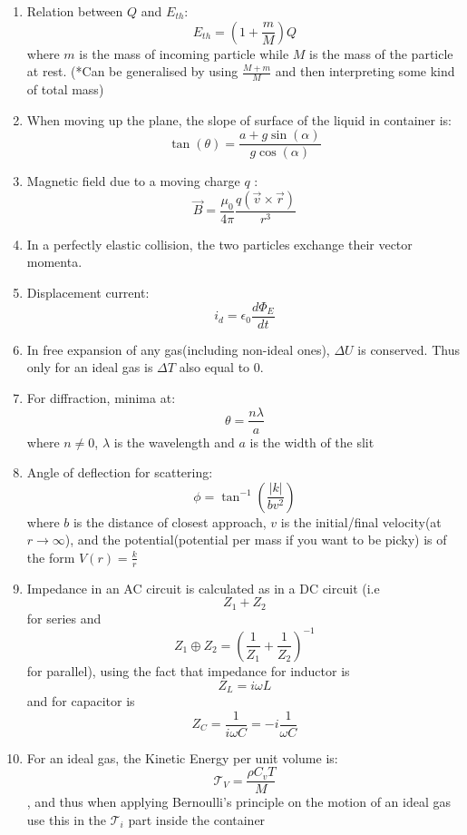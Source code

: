 \documentclass{article}
\numberwithin{equation}{section}
\numberwithin{figure}{section}
\newcommand{\Cr}{\times}
\begin{document}
\begin{enumerate}
	\item Relation between $Q$ and $E_{th}$:
		\begin{equation}
			E_{th}=\left(1+\frac{m}{M}\right) Q
		\end{equation}
		where $m$ is the mass of incoming particle while $M$ is the mass of the particle at rest. (*Can be generalised by using $\frac{M+m}{M}$ and then interpreting some kind of total mass)
	\item When moving up the plane, the slope of surface of the liquid in container is:
		\begin{equation}
			\tan(\theta)=\frac{a+g \sin(\alpha)}{g\cos(\alpha)}
		\end{equation}
	\item Magnetic field due to a moving charge $q$ :
		\begin{equation}
			\vec{B}=\frac{\mu_0}{4\pi}\frac{q(\vec{v}\Cr\vec{r})}{r^3}
		\end{equation}
	\item In a perfectly elastic collision, the two particles exchange their vector momenta.
	\item Displacement current:
		\begin{equation}
			i_d=\epsilon_0 \frac{d\Phi_E}{dt}
		\end{equation}
	\item In free expansion of any gas(including non-ideal ones), $\Delta U$ is conserved. Thus only for an ideal gas is $\Delta T$ also equal to $0$.
	\item For diffraction, minima at: $$\theta=\frac{n\lambda}{a}$$
		where $n\neq 0$, $\lambda$ is the wavelength and $a$ is the width of the slit
	\item Angle of deflection for scattering:
		\begin{equation}
			\phi=\tan^{-1}\left(\frac{|k|}{bv^2}\right)
		\end{equation}
		where $b$ is the distance of closest approach, $v$ is the initial/final velocity(at $r\rightarrow \infty$), and the potential(potential per mass if you want to be picky) is of the form $V(r)=\frac{k}{r}$
	\item Impedance in an AC circuit is calculated as in a DC circuit (i.e $$Z_1+Z_2$$ for series and $$Z_1\oplus Z_2=\left(\frac{1}{Z_1}+\frac{1}{Z_2}\right)^{-1}$$ for parallel), using the fact that impedance for inductor is $$Z_L=i\omega L$$ and for capacitor is $$Z_C=\frac{1}{i\omega C}=-i\frac{1}{\omega C}$$
	\item For an ideal gas, the Kinetic Energy per unit volume is: $$\mathcal{T}_{V}=\frac{\rho C_v T}{M}$$, and thus when applying Bernoulli's principle on the motion of an ideal gas use this in the $\mathcal{T}_{i}$ part inside the container 

\end{enumerate}
\end{document}
